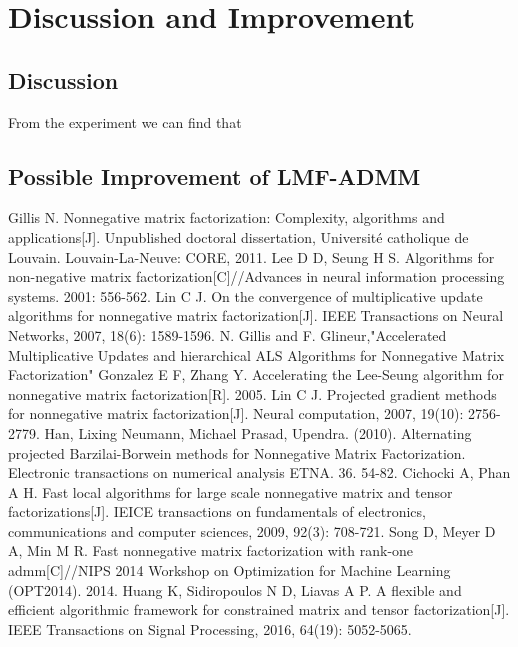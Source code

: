 \documentclass{article}
\begin{document}
\section{Discussion and Improvement}
\subsection{Discussion}
	From the experiment we can find that 
	
\subsection{Possible Improvement of LMF-ADMM}

\begin{thebibliography}{99}  
	Gillis N. Nonnegative matrix factorization: Complexity, algorithms and applications[J]. Unpublished doctoral dissertation, Université catholique de Louvain. Louvain-La-Neuve: CORE, 2011.
	Lee D D, Seung H S. Algorithms for non-negative matrix factorization[C]//Advances in neural information processing systems. 2001: 556-562.
	Lin C J. On the convergence of multiplicative update algorithms for nonnegative matrix factorization[J]. IEEE Transactions on Neural Networks, 2007, 18(6): 1589-1596.
	N. Gillis and F. Glineur,"Accelerated Multiplicative Updates and hierarchical ALS Algorithms for Nonnegative Matrix Factorization"
	Gonzalez E F, Zhang Y. Accelerating the Lee-Seung algorithm for nonnegative matrix factorization[R]. 2005.
	Lin C J. Projected gradient methods for nonnegative matrix factorization[J]. Neural computation, 2007, 19(10): 2756-2779.
	Han, Lixing  Neumann, Michael Prasad, Upendra. (2010). Alternating projected Barzilai-Borwein methods for Nonnegative Matrix Factorization. Electronic transactions on numerical analysis ETNA. 36. 54-82. 
	Cichocki A, Phan A H. Fast local algorithms for large scale nonnegative matrix and tensor factorizations[J]. IEICE transactions on fundamentals of electronics, communications and computer sciences, 2009, 92(3): 708-721.
	Song D, Meyer D A, Min M R. Fast nonnegative matrix factorization with rank-one admm[C]//NIPS 2014 Workshop on Optimization for Machine Learning (OPT2014). 2014.
	Huang K, Sidiropoulos N D, Liavas A P. A flexible and efficient algorithmic framework for constrained matrix and tensor factorization[J]. IEEE Transactions on Signal Processing, 2016, 64(19): 5052-5065.
\end{thebibliography}
\end{document}
